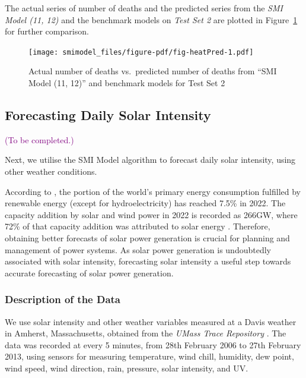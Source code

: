 \documentclass[11pt,a4paper,]{article}
\begin{document}
The actual series of number of deaths and the predicted series from the
\emph{SMI Model (11, 12)} and the benchmark models on \emph{Test Set 2}
are plotted in Figure~\ref{fig-heatPred} for further comparison.

\begin{figure}

{\centering \texttt{[image: smimodel\_files/figure-pdf/fig-heatPred-1.pdf]}

}

\caption{\label{fig-heatPred}Actual number of deaths vs.~predicted
number of deaths from ``SMI Model (11, 12)'' and benchmark models for
Test Set 2}

\end{figure}

\hypertarget{forecasting-daily-solar-intensity}{%
\subsection{Forecasting Daily Solar
Intensity}\label{forecasting-daily-solar-intensity}}

\textcolor{purple}{(To be completed.)} \newline

Next, we utilise the SMI Model algorithm to forecast daily solar
intensity, using other weather conditions.

According to \textcite{EI2023}, the portion of the world's primary
energy consumption fulfilled by renewable energy (except for
hydroelectricity) has reached 7.5\% in 2022. The capacity addition by
solar and wind power in 2022 is recorded as 266GW, where 72\% of that
capacity addition was attributed to solar energy \autocite{EI2023}.
Therefore, obtaining better forecasts of solar power generation is
crucial for planning and management of power systems. As solar power
generation is undoubtedly associated with solar intensity, forecasting
solar intensity a useful step towards accurate forecasting of solar
power generation.

\hypertarget{description-of-the-data-1}{%
\subsubsection{Description of the
Data}\label{description-of-the-data-1}}

We use solar intensity and other weather variables measured at a Davis
weather in Amherst, Massachusetts, obtained from the \emph{UMass Trace
Repository} \autocite{Umass2023}. The data was recorded at every 5
minutes, from 28th February 2006 to 27th February 2013, using sensors
for measuring temperature, wind chill, humidity, dew point, wind speed,
wind direction, rain, pressure, solar intensity, and UV.
\end{document}
